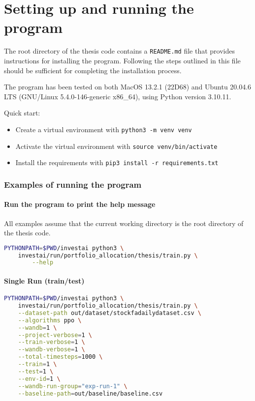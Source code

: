 \documentclass[../xlapes02]{subfiles}
\begin{document}
    \chapter{Setting up and running the program}
    The root directory of the thesis code contains a \texttt{README.md} file that provides instructions for installing the program. Following the steps outlined in this file should be sufficient for completing the installation process.

    The program has been tested on both MacOS 13.2.1 (22D68) and Ubuntu 20.04.6 LTS (GNU/Linux 5.4.0-146-generic x86\_64), using Python version 3.10.11.

    Quick start:
    \begin{itemize}
        \item Create a virtual environment with \texttt{python3 -m venv venv}
        \item Activate the virtual environment with \texttt{source venv/bin/activate}
        \item Install the requirements with \texttt{pip3 install -r requirements.txt}
    \end{itemize}

    \subsection{Examples of running the program}

    \subsubsection{Run the program to print the help message}
    All examples assume that the current working directory is the root directory of the thesis code.
    \begin{lstlisting}[language=bash]
PYTHONPATH=$PWD/investai python3 \
    investai/run/portfolio_allocation/thesis/train.py \
        --help
    \end{lstlisting}

    \subsubsection{Single Run (train/test)}
    \begin{lstlisting}[language=bash]
PYTHONPATH=$PWD/investai python3 \
    investai/run/portfolio_allocation/thesis/train.py \
    --dataset-path out/dataset/stockfadailydataset.csv \
    --algorithms ppo \
    --wandb=1 \
    --project-verbose=1 \
    --train-verbose=1 \
    --wandb-verbose=1 \
    --total-timesteps=1000 \
    --train=1 \
    --test=1 \
    --env-id=1 \
    --wandb-run-group="exp-run-1" \
    --baseline-path=out/baseline/baseline.csv
    \end{lstlisting}
\end{document}
